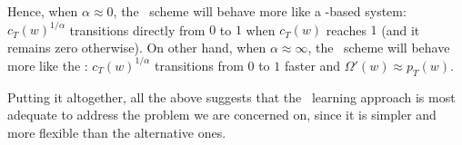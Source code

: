 \noindent Hence, when $\alpha \approx 0$, the \CLSELB\ scheme will behave more
like a \BULSELA-based system: $c_T(w)^{1/\alpha}$ transitions directly from $0$
to $1$ when $c_T(w)$ reaches $1$ (and it remains zero otherwise).
On other hand, when $\alpha \approx \infty$, the \CLSELB\ scheme will behave more
like the \CLSELA: $c_T(w)^{1/\alpha}$ transitions from $0$ to $1$ faster and
$\Omega'(w) \approx p_T(w)$.

Putting it altogether, all the above suggests that the \CLSELB\ learning
approach is most adequate to address the problem we are concerned on, since it
is simpler and more flexible than the alternative ones.









% 


